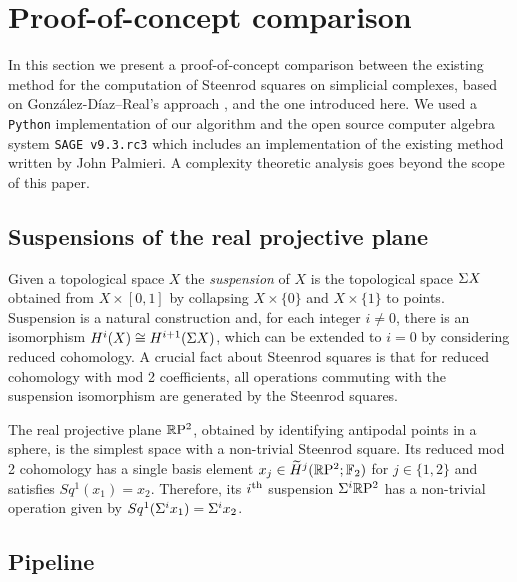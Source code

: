 
\section{Proof-of-concept comparison} \label{s:comparison}

In this section we present a proof-of-concept comparison between the existing method for the computation of Steenrod squares on simplicial complexes, based on Gonz\'alez-D\'iaz--Real's approach \cite[Corollary 3.2]{gonzalez-diaz1999steenrod}, and the one introduced here.
We used a \verb|Python| implementation of our algorithm and the open source computer algebra system \verb|SAGE v9.3.rc3| \cite{sagemath} which includes an implementation of the existing method written by John Palmieri.
A complexity theoretic analysis goes beyond the scope of this paper.

\subsection{Suspensions of the real projective plane}

Given a topological space $X$ the \textit{suspension} of $X$ is the topological space $\Sigma X$ obtained from $X \times [0,1]$ by collapsing $X \times \{0\}$ and $X \times \{1\}$ to points.
Suspension is a natural construction and, for each integer $i \neq 0$, there is an isomorphism $H^i(X) \cong H^{i+1}(\Sigma X)$, which can be extended to $i = 0$ by considering reduced cohomology.
A crucial fact about Steenrod squares is that for reduced cohomology with mod 2 coefficients, all operations commuting with the suspension isomorphism are generated by the Steenrod squares.

The real projective plane $\mathbb{R}\mathrm{P}^2$, obtained by identifying antipodal points in a sphere, is the simplest space with a non-trivial Steenrod square.
Its reduced mod 2 cohomology has a single basis element $x_j \in \widetilde{H}^j(\mathbb{R}\mathrm{P}^2; {\mathbb{F}_2})$ for $j \in \{1, 2\}$ and satisfies $Sq^1(x_1) = x_2$.
Therefore, its $i^{\mathrm{th}}$ suspension $\Sigma^i \mathbb{R}\mathrm{P}^2$ has a non-trivial operation given by $Sq^1(\Sigma^i x_1) = \Sigma^i x_2$.

\subsection{Pipeline}

